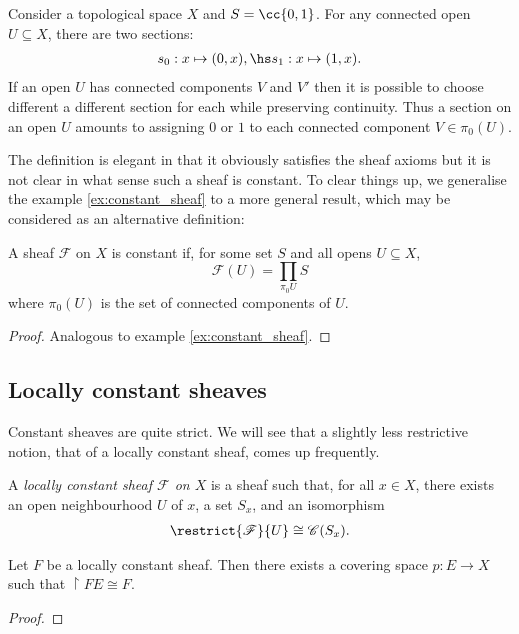 \documentclass{article}
\begin{document}
\begin{example}\label{ex:constant_sheaf}
  Consider a topological space $X$ and $S=\cc{0,1}$. For any
  connected open $U\subseteq X$, there are two sections:
  \begin{align*}
    s_0:x \mapsto(0,x), \hs s_1:x\mapsto(1,x).
  \end{align*}
  If an open $U$ has connected components $V$ and $V'$ then
  it is possible to choose different a different section for each
  while preserving continuity. Thus a section on an open $U$ amounts
  to assigning $0$ or $1$ to each connected component $V\in\pi_0(U)$.
\end{example}

The definition is elegant in that it obviously satisfies the sheaf
axioms but it is not clear in what sense such a sheaf is constant.
To clear things up, we generalise the example \ref{ex:constant_sheaf}
to a more general result, which may be considered as an alternative
definition:

\begin{proposition}
  A sheaf $\mathscr F$ on $X$ is constant if, for some set $S$ and all opens $U\subseteq X$,
  \begin{equation}
    \mathscr F(U) = \prod_{\pi_0U}S
  \end{equation}
  where $\pi_0(U)$ is the set of connected components of $U$.
  \begin{proof}
    Analogous to example \ref{ex:constant_sheaf}.
  \end{proof}
\end{proposition}

\subsection{Locally constant sheaves}

Constant sheaves are quite strict. We will see that a slightly less
restrictive notion, that of a locally constant sheaf, comes up
frequently. 

\begin{definition}
  A \emph{locally constant sheaf $\mathscr F$ on $X$} is a sheaf such that,
  for all $x\in X$, there exists an open neighbourhood $U$ of $x$,
  a set $S_x$, and an isomorphism
  \begin{align*}
    \restrict{\mathscr F}{U} \cong \mathscr C(S_x).
  \end{align*}
\end{definition}


\begin{theorem}
  Let $F$ be a locally constant sheaf. Then there exists a covering space
  $p:E\to X$ such that $\restriction{F}{E} \cong F$.
  \begin{proof}
    \missingproof
  \end{proof}
\end{theorem}
\end{document}
